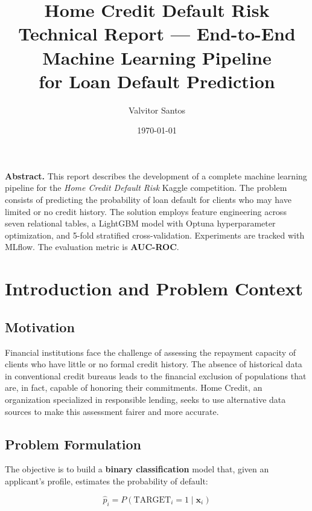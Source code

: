 \documentclass[12pt, a4paper]{article}
\title{
    \vspace{-1cm}
    {\Large \textbf{Home Credit Default Risk}} \\[0.5em]
    {\large Technical Report --- End-to-End Machine Learning Pipeline\\
    for Loan Default Prediction}
}
\author{Valvitor Santos}
\date{\today}
\begin{document}
\maketitle
\thispagestyle{fancy}

\begin{center}
\begin{minipage}{0.85\textwidth}
\small\textbf{Abstract.}
This report describes the development of a complete machine learning pipeline for the
\textit{Home Credit Default Risk} Kaggle competition. The problem consists of predicting
the probability of loan default for clients who may have limited or no credit history.
The solution employs feature engineering across seven relational tables, a LightGBM model
with Optuna hyperparameter optimization, and 5-fold stratified cross-validation.
Experiments are tracked with MLflow. The evaluation metric is \textbf{AUC-ROC}.
\end{minipage}
\end{center}

\bigskip
\tableofcontents
\newpage

\section{Introduction and Problem Context}

\subsection{Motivation}

Financial institutions face the challenge of assessing the repayment capacity of clients
who have little or no formal credit history. The absence of historical data in conventional
credit bureaus leads to the financial exclusion of populations that are, in fact, capable
of honoring their commitments. Home Credit, an organization specialized in responsible
lending, seeks to use alternative data sources to make this assessment fairer and more
accurate.

\subsection{Problem Formulation}

The objective is to build a \textbf{binary classification} model that, given an
applicant's profile, estimates the probability of default:

\begin{equation}
    \hat{p}_i = P(\text{TARGET}_i = 1 \mid \mathbf{x}_i)
\end{equation}
\end{document}
